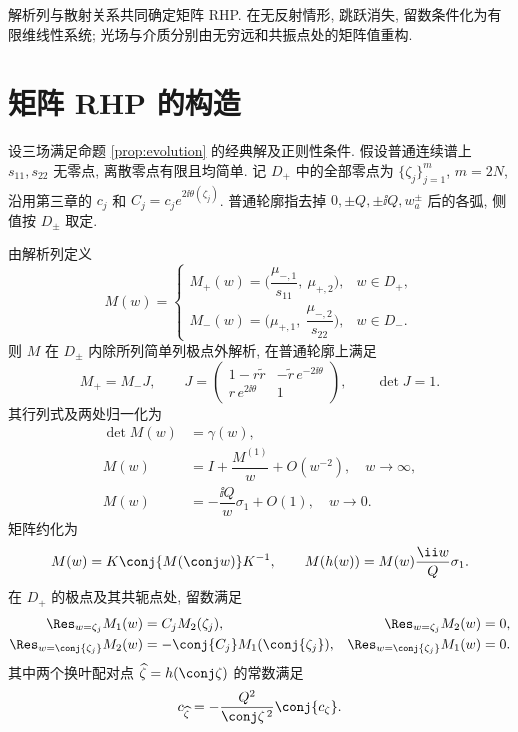 解析列与散射关系共同确定矩阵 RHP. 在无反射情形, 跳跃消失, 留数条件化为有限维线性系统; 光场与介质分别由无穷远和共振点处的矩阵值重构.

\section{矩阵 RHP 的构造}
设三场满足命题 \ref{prop:evolution} 的经典解及正则性条件. 假设普通连续谱上 $s_{11},s_{22}$ 无零点, 离散零点有限且均简单. 记 $D_+$ 中的全部零点为 $\{\zeta_j\}_{j=1}^{m}$, $m=2N$, 沿用第三章的 $c_j$ 和 $C_j=c_je^{2\ii\theta(\zeta_j)}$. 普通轮廓指去掉 $0,\pm Q,\pm\ii Q,w_a^\pm$ 后的各弧, 侧值按 $D_\pm$ 取定.

\begin{theorem}[非零背景的矩阵散射问题]\label{thm:RHP}\label{prop:respair}\label{prop:jump}
由解析列定义
\begin{equation}\label{eq:Mdef}
M(w)=
\begin{cases}
M_+(w)=\bigl(\dfrac{\mu_{-,1}}{s_{11}},\ \mu_{+,2}\bigr),&w\in D_+,\\
M_-(w)=\bigl(\mu_{+,1},\ \dfrac{\mu_{-,2}}{s_{22}}\bigr),&w\in D_-.
\end{cases}
\end{equation}
则 $M$ 在 $D_\pm$ 内除所列简单列极点外解析, 在普通轮廓上满足
\begin{equation}\label{eq:jump}
M_+=M_-J,\qquad
J=\begin{pmatrix}
1-r\widetilde r&-\widetilde r\,e^{-2\ii\theta}\\
r\,e^{2\ii\theta}&1
\end{pmatrix},\qquad \det J=1.
\end{equation}
其行列式及两处归一化为
\begin{align}
\det M(w)&=\gamma(w),\label{eq:detM}\\
M(w)&=I+\dfrac{M^{(1)}}{w}+O(w^{-2}),\quad w\to\infty,\label{eq:Minfty}\\
M(w)&=-\dfrac{\ii Q}{w}\sigma_1+O(1),\quad w\to0.\label{eq:Mzero}
\end{align}
矩阵约化为
\begin{equation}\label{eq:Msym}
M(w)=K\conj{M(\conj w)}K^{-1},\qquad
M(h(w))=M(w)\dfrac{\ii w}{Q}\sigma_1.
\end{equation}
在 $D_+$ 的极点及其共轭点处, 留数满足
\begin{align}
\Res_{w=\zeta_j}M_1(w)&=C_jM_2(\zeta_j),&
\Res_{w=\zeta_j}M_2(w)&=0,\label{eq:resplus}\\
\Res_{w=\conj{\zeta_j}}M_2(w)&=-\conj{C_j}M_1(\conj{\zeta_j}),&
\Res_{w=\conj{\zeta_j}}M_1(w)&=0.\label{eq:resminus}
\end{align}
其中两个换叶配对点 $\widehat\zeta=h(\conj\zeta)$ 的常数满足
\begin{equation}\label{eq:cpair}
c_{\widehat\zeta}=-\dfrac{Q^2}{\conj\zeta^{\,2}}\conj{c_\zeta}.
\end{equation}
\end{theorem}
